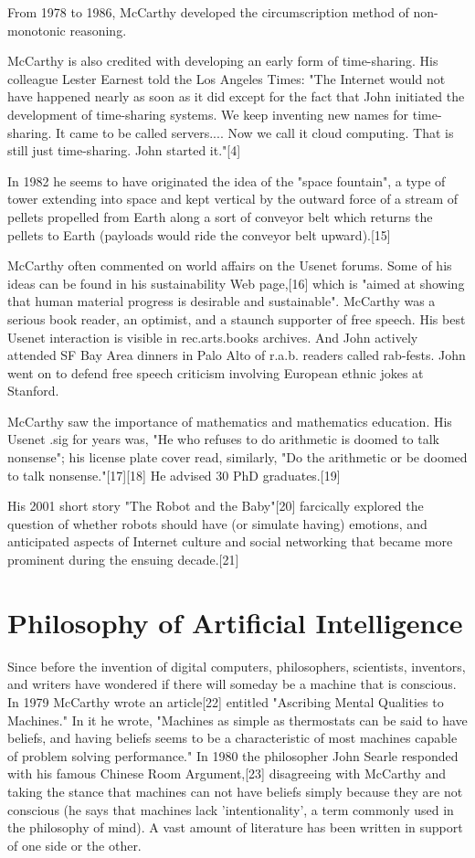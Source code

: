 \documentclass[pdftex, a4paper, 12pt]{article}
\begin{document}
{From 1978 to 1986, McCarthy developed the circumscription method of non-monotonic reasoning.

McCarthy is also credited with developing an early form of time-sharing. His colleague Lester Earnest told the Los Angeles Times: "The Internet would not have happened nearly as soon as it did except for the fact that John initiated the development of time-sharing systems. We keep inventing new names for time-sharing. It came to be called servers.... Now we call it cloud computing. That is still just time-sharing. John started it."[4]

In 1982 he seems to have originated the idea of the "space fountain", a type of tower extending into space and kept vertical by the outward force of a stream of pellets propelled from Earth along a sort of conveyor belt which returns the pellets to Earth (payloads would ride the conveyor belt upward).[15]

McCarthy often commented on world affairs on the Usenet forums. Some of his ideas can be found in his sustainability Web page,[16] which is "aimed at showing that human material progress is desirable and sustainable". McCarthy was a serious book reader, an optimist, and a staunch supporter of free speech. His best Usenet interaction is visible in rec.arts.books archives. And John actively attended SF Bay Area dinners in Palo Alto of r.a.b. readers called rab-fests. John went on to defend free speech criticism involving European ethnic jokes at Stanford.

McCarthy saw the importance of mathematics and mathematics education. His Usenet .sig for years was, "He who refuses to do arithmetic is doomed to talk nonsense"; his license plate cover read, similarly, "Do the arithmetic or be doomed to talk nonsense."[17][18] He advised 30 PhD graduates.[19]

His 2001 short story "The Robot and the Baby"[20] farcically explored the question of whether robots should have (or simulate having) emotions, and anticipated aspects of Internet culture and social networking that became more prominent during the ensuing decade.[21]
}

\section{Philosophy of Artificial Intelligence}

{\raggedright  Since before the invention of digital computers, philosophers, scientists, inventors, and writers have wondered if there will someday be a machine that is conscious. In 1979 McCarthy wrote an article[22] entitled "Ascribing Mental Qualities to Machines." In it he wrote, "Machines as simple as thermostats can be said to have beliefs, and having beliefs seems to be a characteristic of most machines capable of problem solving performance." In 1980 the philosopher John Searle responded with his famous Chinese Room Argument,[23] disagreeing with McCarthy and taking the stance that machines can not have beliefs simply because they are not conscious (he says that machines lack 'intentionality', a term commonly used in the philosophy of mind). A vast amount of literature has been written in support of one side or the other.
}


\end{document}
